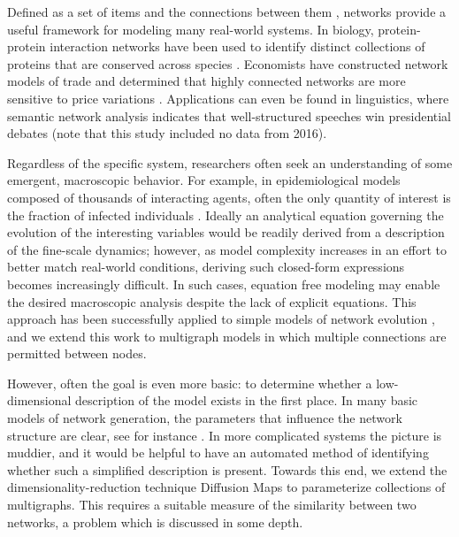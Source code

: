 Defined as a set of items and the connections between them
\cite{newman_structure_2003}, networks provide a useful framework for
modeling many real-world systems. In biology, protein-protein
interaction networks have been used to identify distinct collections
of proteins that are conserved across species
\cite{wuchty_evolutionary_2003}. Economists have constructed network
models of trade and determined that highly connected networks are more
sensitive to price variations \cite{li_spatial_2008}. Applications
can even be found in linguistics, where semantic network analysis
indicates that well-structured speeches win presidential debates
\cite{doerfel_semantic_2009} (note that
this study included no data from 2016).

Regardless of the specific system, researchers often seek an
understanding of some emergent, macroscopic behavior. For example, in
epidemiological models composed of thousands of interacting agents,
often the only quantity of interest is the fraction of infected
individuals \cite{shi_sis_2008}. Ideally an analytical equation
governing the evolution of the interesting variables would be readily
derived from a description of the fine-scale dynamics; however, as
model complexity increases in an effort to better match real-world
conditions, deriving such closed-form expressions becomes increasingly
difficult. In such cases, equation free modeling may enable the
desired macroscopic analysis despite the lack of explicit
equations. This approach has been successfully applied to simple models
of network evolution \cite{bold_equation-free_2014}, and we extend
this work to multigraph models in which multiple connections are
permitted between nodes.

However, often the goal is even more basic: to determine whether a
low-dimensional description of the model exists in the first place. In
many basic models of network generation, the parameters that influence
the network structure are clear, see for instance
\cite{erdos_random_1959,chung_connected_2002,watts_collective_1998,barabasi_emergence_1999}. In more complicated systems the picture is muddier, and
it would be helpful to have an automated method of identifying whether
such a simplified description is present. Towards this end, we extend
the dimensionality-reduction technique Diffusion Maps to parameterize
collections of multigraphs. This requires a suitable measure of the
similarity between two networks, a problem which is discussed in some
depth. \\

